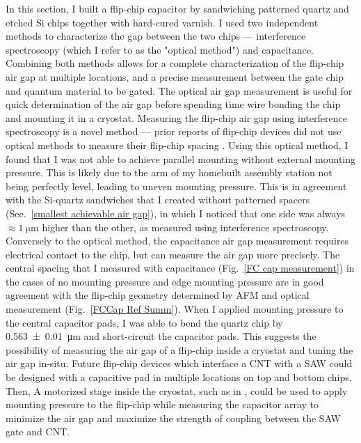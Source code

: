 \documentclass[double,12pt,1in,seploa]{beavtex}
\begin{document}
In this section, I built a flip-chip capacitor by sandwiching patterned quartz and etched Si chips together with hard-cured varnish. I used two independent methods to characterize the gap between the two chips — interference spectroscopy (which I refer to as the "optical method") and capacitance. Combining both methods allows for a complete characterization of the flip-chip air gap at multiple locations, and a precise measurement between the gate chip and quantum material to be gated. The optical air gap measurement is useful for quick determination of the air gap before spending time wire bonding the chip and mounting it in a cryostat. Measuring the flip-chip air gap using interference spectroscopy is a novel method — prior reports of flip-chip devices did not use optical methods to measure their flip-chip spacing \cite{beukman_noninvasive_2015, chu_creation_2018,satzinger_quantum_2018,bennaceur_mechanical_2015}. Using this optical method, I found that I was not able to achieve parallel mounting without external mounting pressure. This is likely due to the arm of my homebuilt assembly station not being perfectly level, leading to uneven mounting pressure. This is in agreement with the Si-quartz sandwiches that I created without patterned spacers (Sec.\ \ref{smallest achievable air gap}), in which I noticed that one side was always $\approx \SI{1}{\micro\meter}$ higher than the other, as measured using interference spectroscopy. Conversely to the optical method, the capacitance air gap measurement requires electrical contact to the chip, but can measure the air gap more precisely. The central spacing that I measured with capacitance (Fig.\ \ref{FC cap measurement}) in the cases of no mounting pressure and edge mounting pressure are in good agreement with the flip-chip geometry determined by AFM and optical measurement (Fig.\ \ref{FCCap Ref Summ}). When I applied mounting pressure to the central capacitor pads, I was able to bend the quartz chip by \SI{0.563(10)}{\micro\meter} and short-circuit the capacitor pads. This suggests the possibility of measuring the air gap of a flip-chip inside a cryostat and tuning the air gap in-situ. Future flip-chip devices which interface a CNT with a SAW could be designed with a capacitive pad in multiple locations on top and bottom chips. Then, A motorized stage inside the cryostat, such as in \cite{inbar_quantum_2023}, could be used to apply mounting pressure to the flip-chip while measuring the capacitor array to minimize the air gap and maximize the strength of coupling between the SAW gate and CNT. 
\end{document}
